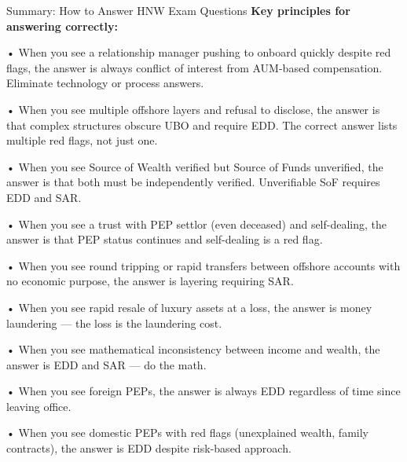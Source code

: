 \documentclass[11pt,a4paper]{beamer}
\begin{document}
	\begin{frame}{Summary: How to Answer HNW Exam Questions}
		\tiny
		\noindent\textbf{Key principles for answering correctly:}
		
		\vspace{0.1cm}
		\noindent• When you see a relationship manager pushing to onboard quickly despite red flags, the answer is always conflict of interest from AUM-based compensation. Eliminate technology or process answers.
		
		\vspace{0.1cm}
		\noindent• When you see multiple offshore layers and refusal to disclose, the answer is that complex structures obscure UBO and require EDD. The correct answer lists multiple red flags, not just one.
		
		\vspace{0.1cm}
		\noindent• When you see Source of Wealth verified but Source of Funds unverified, the answer is that both must be independently verified. Unverifiable SoF requires EDD and SAR.
		
		\vspace{0.1cm}
		\noindent• When you see a trust with PEP settlor (even deceased) and self-dealing, the answer is that PEP status continues and self-dealing is a red flag.
		
		\vspace{0.1cm}
		\noindent• When you see round tripping or rapid transfers between offshore accounts with no economic purpose, the answer is layering requiring SAR.
		
		\vspace{0.1cm}
		\noindent• When you see rapid resale of luxury assets at a loss, the answer is money laundering — the loss is the laundering cost.
		
		\vspace{0.1cm}
		\noindent• When you see mathematical inconsistency between income and wealth, the answer is EDD and SAR — do the math.
		
		\vspace{0.1cm}
		\noindent• When you see foreign PEPs, the answer is always EDD regardless of time since leaving office.
		
		\vspace{0.1cm}
		\noindent• When you see domestic PEPs with red flags (unexplained wealth, family contracts), the answer is EDD despite risk-based approach.
		

\end{frame}
\end{document}
